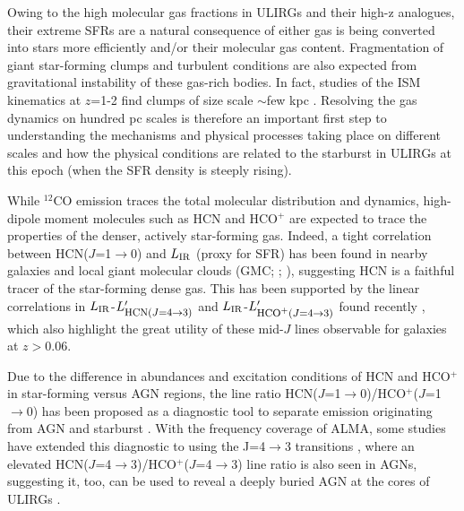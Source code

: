 \documentclass[12pt,a4paper]{article}
\newcommand{\comol}{$^{12}$CO\xspace}
\newcommand{\LIR}{\mbox{$L_{\rm IR}$}\xspace}
\newcommand{\rarr}{$\rightarrow$}
\newcommand{\ahcn}{HCN($J$=1\rarr0)\xspace}
\newcommand{\dhcn}{HCN($J$=4\rarr3)\xspace}
\newcommand{\hcop}{HCO$^+$\xspace}
\newcommand{\dhcop}{HCO$^+$($J$=4\rarr3)\xspace}
\newcommand{\Lp}[1][CO]{\mbox{$L^{\prime}_\textrm{\fontsize{8pt}{12pt}\selectfont{#1}}$}}
\newcommand{\Fig}[1]{Fig.~\ref{fig:#1}}
\begin{document}
Owing to the high molecular gas fractions in ULIRGs and their high-z analogues,
their extreme SFRs are a natural consequence of either gas is being converted into stars
more efficiently and/or their molecular gas content. Fragmentation
of giant star-forming clumps and turbulent conditions are also expected 
from gravitational instability of these gas-rich bodies. 
In fact, studies of the ISM kinematics at $z$=1-2 find clumps of size scale
 $\sim$few kpc \citep{Swinbank12a, Swinbank12b}. 
Resolving the gas dynamics on hundred pc scales is therefore an important first step
to understanding the mechanisms and physical processes taking
place on different scales and how the physical conditions 
are related to the starburst in ULIRGs at this epoch (when the SFR density is steeply rising).

While \comol emission traces the total molecular distribution and dynamics,
high-dipole moment molecules such as HCN and \hcop are expected to trace the 
properties of the denser, actively star-forming gas. Indeed, a tight correlation between \ahcn and \LIR 
(proxy for SFR) has been found in nearby galaxies and local giant molecular 
clouds (GMC; \citealt[hereafter GS04]{Gao04a}; \citealt{Wu05}), 
suggesting HCN is a faithful tracer of the star-forming dense gas.
This has been supported by the linear correlations in 
\LIR-\Lp[\dhcn] and \LIR-\Lp[\dhcop] found recently \citep[hereafter Z14; see \Fig{SF}]{Zhang14a}, which also highlight 
the great utility of these mid-$J$ lines observable for galaxies at $z$$>$0.06.

Due to the difference in abundances and excitation conditions of HCN and \hcop
in star-forming versus AGN regions, the line ratio \ahcn/HCO$^+$($J$=1\rarr0) has been 
proposed as a diagnostic tool to separate emission originating from AGN and starburst
\citep{Kohno05a, Imanishi10, Izumi13a}. 
With the frequency coverage of ALMA, some studies have 
extended this diagnostic to using the J=4\rarr3 transitions 
\citep{Imanishi14a, GB14a, Viti14a}, where 
an elevated \dhcn/\dhcop line ratio is also seen in AGNs, suggesting
it, too, can be used to reveal a deeply buried AGN at the cores of ULIRGs \citep{Izumi16a, Imanishi16a}.
\end{document}
